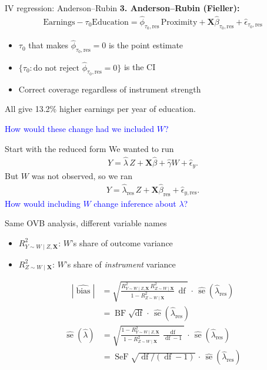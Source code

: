 \documentclass[xcolor=dvipsnames]{beamer}
\newcommand{\mb}{\mathbf}
\newcommand{\X}{\ensuremath{\mb{X}}}
\DeclareMathOperator{\se}{se}
\DeclareMathOperator{\df}{df}
\DeclareMathOperator{\bias}{bias}
\DeclareMathOperator{\BF}{BF}
\DeclareMathOperator{\SeF}{SeF}
\begin{document}
\begin{frame}{IV regression: Anderson--Rubin}
\textbf{3. Anderson--Rubin (Fieller):}
\begin{align*}
\text{Earnings} - \tau_0 \text{Education} = \hat{\phi}_{\tau_0,\text{res}}\,\text{Proximity} + \X\hat{\beta}_{\tau_0,\text{res}} + \hat{\epsilon}_{\tau_0, \text{res}}
\end{align*}
\small
\begin{itemize}
\item $\tau_0$ that makes $\hat{\phi}_{\tau_0,\text{res}} = 0$ is the point estimate
\item $\{\tau_0 : \text{do not reject } \hat{\phi}_{\tau_0,\text{res}} = 0\}$ is the CI
\item Correct coverage regardless of instrument strength
\end{itemize}
\bigskip
{} All give 13.2\% higher earnings per year of education.
\medskip
\begin{center}
 \textcolor{blue}{How would these change had we included $W$?}
\end{center}
\end{frame}


\begin{frame}{Start with the reduced form}
 We wanted to run
\begin{align*}
Y = \hat{\lambda}\, Z + \X\hat{\beta} + \hat{\gamma} W + \hat{\epsilon}_y.
\end{align*}
\medskip
{} But $W$ was not observed, so we ran
\begin{align*}
Y = \hat{\lambda}_{\text{res}}\, Z + \X\hat{\beta}_{\text{res}} + \hat{\epsilon}_{y,\text{res}}.
\end{align*}
\medskip
{} \textcolor{blue}{How would including $W$ change inference about $\lambda$?}
\end{frame}


\begin{frame}{Same OVB analysis, different variable names}
\begin{itemize}
\item $R^2_{Y\sim W \mid Z, \X}$: $W$'s share of outcome variance
\item $R^2_{Z\sim W \mid \X}$: $W$'s share of \textit{instrument} variance
\end{itemize}
\begin{align*}
|\widehat{\bias}|
&= \sqrt{\frac{R^2_{Y\sim W \mid Z, \X}\, R^2_{Z\sim W \mid \X}}{1 - R^2_{Z\sim W \mid \X}}\,\df}\,\cdot\,\widehat{\se}(\hat{\lambda}_{\text{res}}) \\
&= \BF\sqrt{\df}\,\cdot\,\widehat{\se}(\hat{\lambda}_{\text{res}})
\end{align*}
\begin{align*}
\widehat{\se}(\hat{\lambda})
&= \sqrt{\frac{1 - R^2_{Y\sim W \mid Z, \X}}{1 - R^2_{Z\sim W \mid \X}}\,\frac{\df}{\df-1}}\,\cdot\,\widehat{\se}(\hat{\lambda}_{\text{res}}) \\
&= \SeF\sqrt{\df/(\df-1)}\,\cdot\,\widehat{\se}(\hat{\lambda}_{\text{res}})
\end{align*}
\end{frame}
\end{document}
